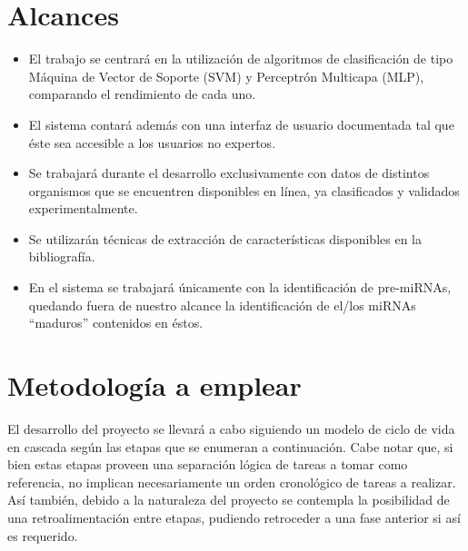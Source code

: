 \documentclass[12pt,bibliography=oldstyle,DIV=12,parskip=full-]{scrartcl}
\begin{document}
\section{Alcances}
\begin{itemize}
\item El trabajo se centrará en la utilización de algoritmos de
  clasificación de tipo Máquina de Vector de Soporte (SVM) y Perceptrón
  Multicapa (MLP), comparando el rendimiento de cada uno.
\item El sistema contará además con una interfaz de usuario
  documentada tal que éste sea accesible a los usuarios no expertos.
\item Se trabajará durante el desarrollo exclusivamente con datos de
  distintos organismos que se encuentren disponibles en línea, ya
  clasificados y validados experimentalmente.
\item Se utilizarán técnicas de extracción de características
  disponibles en la bibliografía.
\item En el sistema se trabajará únicamente con la identificación de
  pre-miRNAs, quedando fuera de nuestro alcance la identificación de
  el/los miRNAs “maduros” contenidos en éstos.
\end{itemize}
%
%
\section{Metodología a emplear}
El desarrollo del proyecto se llevará a cabo siguiendo un modelo de
ciclo de vida en cascada según las etapas que se enumeran a
continuación.  Cabe notar que, si bien estas etapas proveen una
separación lógica de tareas a tomar como referencia, no implican
necesariamente un orden cronológico de tareas a realizar. Así también,
debido a la naturaleza del proyecto se contempla la posibilidad de una
retroalimentación entre etapas, pudiendo retroceder a una fase
anterior si así es requerido.
%
\end{document}
